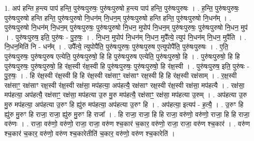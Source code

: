 \documentclass[17pt]{extarticle}
\begin{document}
1. अप॑ हन्ति ह॒न्त्य पाप॑ हन्ति॒ पुरु॑षःपुरुषः॒ पुरु॑षःपुरुषो ह॒न्त्य पाप॑ हन्ति॒ पुरु॑षःपुरुषः । . ह॒न्ति॒ पुरु॑षःपुरुषः॒ पुरु॑षःपुरुषो हन्ति हन्ति॒ पुरु॑षःपुरुषो नि॒धन॑म् नि॒धन॒म् पुरु॑षःपुरुषो हन्ति हन्ति॒ पुरु॑षःपुरुषो नि॒धन᳚म् । . पुरु॑षःपुरुषो नि॒धन॑म् नि॒धन॒म् पुरु॑षःपुरुषः॒ पुरु॑षःपुरुषो नि॒धन॒ मुपोप॑ नि॒धन॒म् पुरु॑षःपुरुषः॒ पुरु॑षःपुरुषो नि॒धन॒ मुप॑ । . पुरु॑षःपुरुष॒ इति॒ पुरु॑षः - पु॒रु॒षः॒ । . नि॒धन॒ मुपोप॑ नि॒धन॑म् नि॒धन॒ मुपै᳚त्ये॒ त्युप॑ नि॒धन॑म् नि॒धन॒ मुपै॑ति । . नि॒धन॒मिति॑ नि - धन᳚म् । . उपै᳚त्ये॒ त्युपोपै॑ति॒ पुरु॑षःपुरुषः॒ पुरु॑षःपुरुष ए॒त्युपोपै॑ति॒ पुरु॑षःपुरुषः । . ए॒ति॒ पुरु॑षःपुरुषः॒ पुरु॑षःपुरुष एत्येति॒ पुरु॑षःपुरुषो॒ हि हि पुरु॑षःपुरुष एत्येति॒ पुरु॑षःपुरुषो॒ हि । . पुरु॑षःपुरुषो॒ हि हि पुरु॑षःपुरुषः॒ पुरु॑षःपुरुषो॒ हि र॑क्ष॒स्वी र॑क्ष॒स्वी हि पुरु॑षःपुरुषः॒ पुरु॑षःपुरुषो॒ हि र॑क्ष॒स्वी । . पुरु॑षःपुरुष॒ इति॒ पुरु॑षः - पु॒रु॒षः॒ । . हि र॑क्ष॒स्वी र॑क्ष॒स्वी हि हि र॑क्ष॒स्वी रक्ष॑साꣳ॒॒ रक्ष॑साꣳ रक्ष॒स्वी हि हि र॑क्ष॒स्वी रक्ष॑साम् । . र॒क्ष॒स्वी रक्ष॑साꣳ॒॒ रक्ष॑साꣳ रक्ष॒स्वी र॑क्ष॒स्वी रक्ष॑सा॒ मप॑हत्या॒ अप॑हत्यै॒ रक्ष॑साꣳ रक्ष॒स्वी र॑क्ष॒स्वी रक्ष॑सा॒ मप॑हत्यै । . रक्ष॑सा॒ मप॑हत्या॒ अप॑हत्यै॒ रक्ष॑साꣳ॒॒ रक्ष॑सा॒ मप॑हत्या उ॒रु मु॒रु मप॑हत्यै॒ रक्ष॑साꣳ॒॒ रक्ष॑सा॒ मप॑हत्या उ॒रुम् । . अप॑हत्या उ॒रु मु॒रु मप॑हत्या॒ अप॑हत्या उ॒रुꣳ हि ह्यु॑रु मप॑हत्या॒ अप॑हत्या उ॒रुꣳ हि । . अप॑हत्या॒ इत्यप॑ - ह॒त्यै॒ । . उ॒रुꣳ हि ह्यु॑रु मु॒रुꣳ हि राजा॒ राजा॒ ह्यु॑रु मु॒रुꣳ हि राजा᳚ । . हि राजा॒ राजा॒ हि हि राजा॒ वरु॑णो॒ वरु॑णो॒ राजा॒ हि हि राजा॒ वरु॑णः । . राजा॒ वरु॑णो॒ वरु॑णो॒ राजा॒ राजा॒ वरु॑ण श्च॒कार॑ च॒कार॒ वरु॑णो॒ राजा॒ राजा॒ वरु॑ण श्च॒कार॑ । . वरु॑ण श्च॒कार॑ च॒कार॒ वरु॑णो॒ वरु॑ण श्च॒कारेतीति॑ च॒कार॒ वरु॑णो॒ वरु॑ण श्च॒कारेति॑ । \newline
\end{document}
